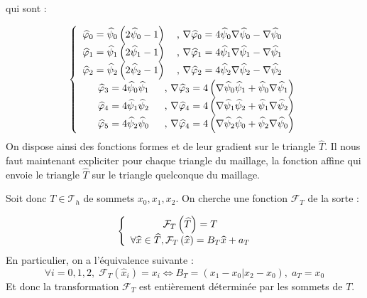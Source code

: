 \documentclass[a4paper,12pt]{article}
\begin{document}
qui sont :

\begin{equation}
\left \{
\begin{array}{c @{} c}
\widehat{\varphi}_0  = \widehat{\psi}_0 \left( 2\widehat{\psi}	_0 -1 \right) & \text{, } \nabla \widehat{\varphi}_0 = 4\widehat{\psi}_0 \nabla \widehat{\psi}_0 - \nabla \widehat{\psi}_0 \\
\widehat{\varphi}_1  = \widehat{\psi}_1 \left( 2\widehat{\psi}	_1 -1 \right) & \text{, } \nabla \widehat{\varphi}_1 = 4\widehat{\psi}_1 \nabla \widehat{\psi}_1 - \nabla \widehat{\psi}_1 \\
\widehat{\varphi}_2  = \widehat{\psi}_2 \left( 2\widehat{\psi}	_2 -1 \right) & \text{, } \nabla \widehat{\varphi}_2 = 4\widehat{\psi}_2 \nabla \widehat{\psi}_2 - \nabla \widehat{\psi}_2 \\
\widehat{\varphi}_3  = 4\widehat{\psi}_0\widehat{\psi}_1 & \text{, } \nabla \widehat{\varphi}_3 = 4 \left( \nabla \widehat{\psi}_0 \widehat{\psi}_1 + \widehat{\psi}_0 \nabla \widehat{\psi}_1 \right) \\
\widehat{\varphi}_4  = 4\widehat{\psi}_1\widehat{\psi}_2 & \text{, } \nabla \widehat{\varphi}_4 = 4 \left( \nabla \widehat{\psi}_1 \widehat{\psi}_2 + \widehat{\psi}_1 \nabla \widehat{\psi}_2 \right) \\
\widehat{\varphi}_5  = 4\widehat{\psi}_2\widehat{\psi}_0 & \text{, } \nabla \widehat{\varphi}_4 = 4 \left( \nabla \widehat{\psi}_2 \widehat{\psi}_0 + \widehat{\psi}_2 \nabla \widehat{\psi}_0 \right) \\
\end{array}
\right.
\end{equation}
On dispose ainsi des fonctions formes et de leur gradient sur le triangle $\widehat{T}$. Il nous faut maintenant expliciter pour chaque triangle du maillage, la fonction affine qui envoie le triangle $\widehat{T}$ sur le triangle quelconque du maillage.

Soit donc $T \in \mathcal{T}_h$ de sommets $x_{0}, x_{1} , x_{2}$. On cherche une fonction $\mathcal{F}_{T}$ de la sorte :

\begin{equation}
\left \{
\begin{array}{c @{} c}
\mathcal{F}_{T} \left( \widehat{T} \right) = T\\
\forall \widehat{x} \in \widehat{T}, \mathcal{F}_T \left( \widehat{x} \right) = B_T \widehat{x} + a_T\\
\end{array}
\right.
\end{equation}
En particulier, on a l'équivalence suivante :
\begin{equation}
\forall i = 0,1,2, \; \mathcal{F}_T \left( \widehat{x}_i \right) = x_i \iff B_T = \left( x_1 - x_0 | x_2 -x_0 \right), \; a_T = x_0
\end{equation}
Et donc la transformation $\mathcal{F}_T$ est entièrement déterminée par les sommets de $T$.
\end{document}
